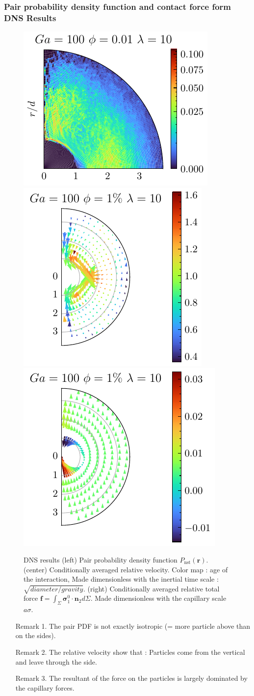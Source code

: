 \documentclass{sintefbeamer}
\begin{document}
\begin{frame}
  \frametitle{Pair probability density function and contact force form DNS Results}

\begin{figure}
  \includegraphics[height=0.3\textwidth]{image/HOMOGENEOUS_NEW/Dist/Pnst_l_10_Ga_100_PHI_0_01.pdf}
  \includegraphics[height=0.3\textwidth]{image/HOMOGENEOUS_NEW/Dist/U_rel_l_10_Ga_100_PHI_1.pdf}
  \includegraphics[height=0.3\textwidth]{image/HOMOGENEOUS_NEW/Dist/F_rel_l_10_Ga_100_PHI_1.pdf}
  \caption{DNS results (left) Pair probability density function $P_\text{nst}(\textbf{r})$. 
  (center) Conditionally averaged relative velocity. Color map : age of the interaction, Made dimensionless with the inertial time scale : $\sqrt{diameter/gravity}$.  
  (right) Conditionally averaged relative total force $\textbf{f} = \int_\Sigma \bm\sigma_1^0\cdot \textbf{n}_2 d\Sigma$. Made dimensionless with the capillary scale $a\sigma$.  
  }
\end{figure}

\begin{enumerate}
  \item[Remark 1.]The pair PDF is not exactly isotropic (= more particle above than on the sides). 
  \item[Remark 2.] The relative velocity show that :
  Particles come from the vertical and leave through the side. 
  \item[Remark 3.] The resultant of the  force  on the particles is largely dominated by the capillary forces.
\end{enumerate}

\end{frame}
\end{document}
